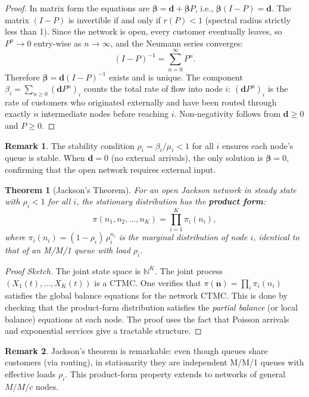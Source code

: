\documentclass[12pt, a4paper]{article}
\theoremstyle{definition}
\newtheorem{remark}{Remark}[section]
\theoremstyle{plain}
\newtheorem{theorem}{Theorem}[section]
\begin{document}
\begin{proof}
In matrix form the equations are $\boldsymbol{\beta} = \mathbf{d} + \boldsymbol{\beta} P$, i.e., $\boldsymbol{\beta}(I-P) = \mathbf{d}$. The matrix $(I-P)$ is invertible if and only if $r(P) < 1$ (spectral radius strictly less than 1). Since the network is open, every customer eventually leaves, so $P^n \to 0$ entry-wise as $n \to \infty$, and the Neumann series converges:
\[
  (I-P)^{-1} = \sum_{n=0}^\infty P^n.
\]
Therefore $\boldsymbol{\beta} = \mathbf{d}(I-P)^{-1}$ exists and is unique. The component $\beta_i = \sum_{n \ge 0} (\mathbf{d}P^n)_i$ counts the total rate of flow into node $i$: $(\mathbf{d}P^n)_i$ is the rate of customers who originated externally and have been routed through exactly $n$ intermediate nodes before reaching $i$. Non-negativity follows from $\mathbf{d} \ge 0$ and $P \ge 0$.
\end{proof}

\begin{remark}
The stability condition $\rho_i = \beta_i/\mu_i < 1$ for all $i$ ensures each node's queue is stable. When $\mathbf{d} = 0$ (no external arrivals), the only solution is $\boldsymbol{\beta} = 0$, confirming that the open network requires external input.
\end{remark}

\begin{theorem}[Jackson's Theorem]
For an open Jackson network in steady state with $\rho_i < 1$ for all $i$, the stationary distribution has the \textbf{product form}:
\[
  \pi(n_1, n_2, \ldots, n_K) = \prod_{i=1}^{K} \pi_i(n_i),
\]
where $\pi_i(n_i) = (1 - \rho_i)\,\rho_i^{n_i}$ is the marginal distribution of node $i$, identical to that of an M/M/1 queue with load $\rho_i$.
\end{theorem}

\begin{proof}[Proof Sketch]
The joint state space is $\mathbb{N}^K$. The joint process $(X_1(t), \ldots, X_K(t))$ is a CTMC. One verifies that $\pi(\mathbf{n}) = \prod_i \pi_i(n_i)$ satisfies the global balance equations for the network CTMC. This is done by checking that the product-form distribution satisfies the \emph{partial balance} (or local balance) equations at each node. The proof uses the fact that Poisson arrivals and exponential services give a tractable structure.
\end{proof}

\begin{remark}
Jackson's theorem is remarkable: even though queues share customers (via routing), in stationarity they are independent M/M/1 queues with effective loads $\rho_i$. This product-form property extends to networks of general $M/M/c$ nodes.
\end{remark}
\end{document}
